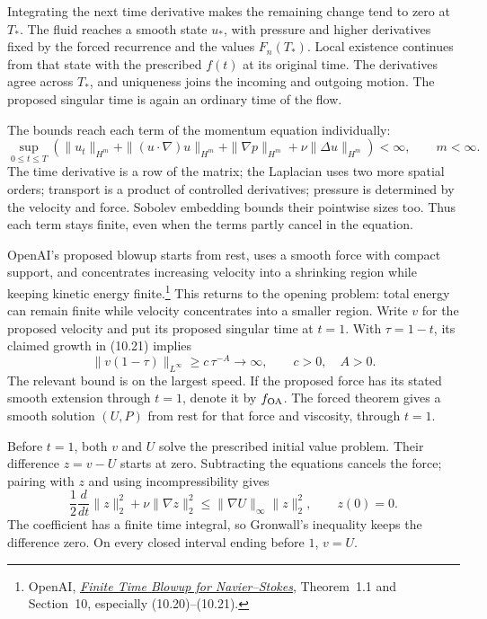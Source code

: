 Integrating the next time derivative makes the remaining change tend to
zero at \(T_*\). The fluid reaches a smooth state \(u_*\), with
pressure and higher derivatives fixed by the forced recurrence and the
values \(F_n(T_*)\). Local existence continues from that state with
the prescribed \(f(t)\) at its original time. The derivatives agree
across \(T_*\), and uniqueness joins the incoming and outgoing motion.
The proposed singular time is again an ordinary time of the flow.

The bounds reach each term of the momentum equation individually:
\[
 \sup_{0\le t\le T}\left(
 \|u_t\|_{H^m}+\|(u\cdot\nabla)u\|_{H^m}
 +\|\nabla p\|_{H^m}+\nu\|\Delta u\|_{H^m}
 \right)<\infty,
 \qquad m<\infty.
\]
The time derivative is a row of the matrix; the Laplacian uses two more
spatial orders; transport is a product of controlled derivatives; pressure
is determined by the velocity and force. Sobolev embedding bounds their
pointwise sizes too. Thus each term stays finite, even when the terms
partly cancel in the equation.

OpenAI's proposed blowup starts from rest, uses a smooth force with compact support,
and concentrates increasing velocity into a shrinking region while keeping
kinetic energy finite.\footnote{OpenAI,
\href{https://cdn.openai.com/pdf/32d9f210-8b73-45e0-91bc-82a30aef8a9a/navier-stokes.pdf}{\emph{Finite Time Blowup for Navier--Stokes}},
Theorem~1.1 and Section~10, especially (10.20)--(10.21).}
This returns to the opening problem: total energy can remain finite while
velocity concentrates into a smaller region. Write \(v\) for the
proposed velocity and put its proposed singular time at \(t=1\).
With \(\tau=1-t\), its claimed growth in (10.21) implies
\[
 \|v(1-\tau)\|_{L^\infty}\ge c\,\tau^{-A}\longrightarrow\infty,
 \qquad c>0,\quad A>0.
\]
The relevant bound is on the largest speed. If the proposed force has
its stated smooth extension through \(t=1\), denote it by
\(f_{\rm OA}\). The forced theorem gives a smooth solution \((U,P)\)
from rest for that force and viscosity, through \(t=1\).

Before \(t=1\), both \(v\) and \(U\) solve the prescribed initial
value problem. Their difference \(z=v-U\) starts at zero. Subtracting
the equations cancels the force; pairing with \(z\) and using
incompressibility gives
\[
 \frac12\frac{d}{dt}\|z\|_2^2+\nu\|\nabla z\|_2^2
 \le\|\nabla U\|_\infty\|z\|_2^2,
 \qquad z(0)=0.
\]
The coefficient has a finite time integral, so Gronwall's inequality
keeps the difference zero. On every closed interval ending before \(1\),
\(v=U\).

